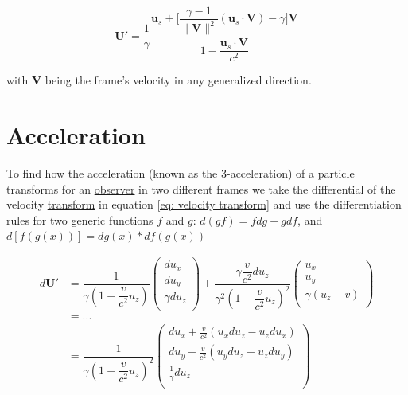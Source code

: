 \begin{equation}
	\mathbf{U}{'} = \dfrac{1}{{\gamma}} \dfrac{\mathbf{u}_s + \Big[\dfrac{{\gamma}-1}{\|\mathbf{V}\|^2}(\mathbf{u}_s\cdot \mathbf{V})-{\gamma} \Big] \mathbf{V}}{1-\dfrac{\mathbf{u}_s\cdot\mathbf{V}}{{c}^2}}
\end{equation}

with ${\mathbf{V}}$ being the frame's velocity in any generalized direction.



\section{Acceleration} \label{sect: Acceleration}

To find how the acceleration (known as the 3-acceleration) of a particle transforms for an \hyperlink{def-observer}{observer} in two different frames we take the differential of the velocity \hyperlink{def-transform}{transform} in equation \eqref{eq: velocity transform} and use the differentiation rules for two generic functions ${f}$ and ${g}$: ${d(gf)} = {f} {dg} + {g} {df}$, and ${d[{{f}({g}(x))}]} = {{dg}(x)} * {df({{g}(x)})}$

\begin{equation}
	\begin{aligned}
		d\mathbf{U}{'} & = \dfrac{1}{{\gamma}\left(1-\dfrac{v}{{c}^2} {{u}_{z}}\right) }
		\begin{pmatrix}
			d{{u}_{x}}          \\
			d{{u}_{y}}          \\
			{\gamma} d{{u}_{z}} \\
		\end{pmatrix}
		+ \dfrac{{\gamma} \dfrac{v}{{c}^2} d{{u}_{z}}}{{\gamma}^2\left(1-\dfrac{v}{{c}^2} {{u}_{z}}\right)^2 }
		\begin{pmatrix}
			{{u}_{x}}                              \\
			{{u}_{y}}                              \\
			{\gamma} \left( {{u}_{z}}- {v} \right) \\
		\end{pmatrix} \\
		               & = ...
		\\
		               & = \dfrac{1}{{\gamma}\left(1-\dfrac{v}{{c}^2} {{u}_{z}}\right)^2 }
		\begin{pmatrix}
			d{{u}_{x}} + \frac{v}{{c}^2}( {{u}_{x}} d{{u}_{z}}-{{u}_{z}} d{{u}_{x}}) \\
			d{{u}_{y}} + \frac{v}{{c}^2}( {{u}_{y}} d{{u}_{z}}-{{u}_{z}} d{{u}_{y}}) \\
			\frac{1}{{\gamma}} d{{u}_{z}}                                            \\
		\end{pmatrix}
	\end{aligned}
\end{equation}

